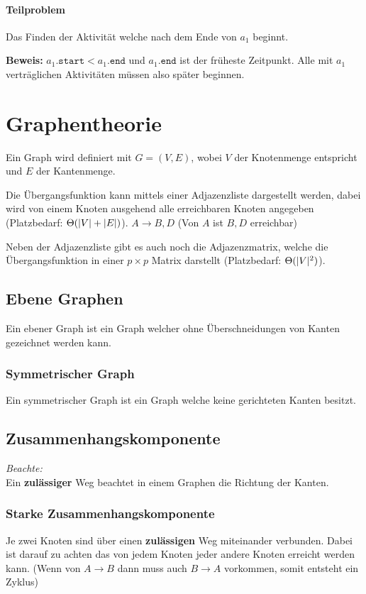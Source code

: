 \documentclass[10pt,a4paper]{article}
\begin{document}
\begin{multicols*}{4}
\paragraph{Teilproblem}
Das Finden der Aktivität welche nach dem Ende von \(a_{1}\) beginnt.

\textbf{Beweis:} \(a_{1}.\mathtt{start} < a_{1}.\mathtt{end}\) und \(a_{1}.\mathtt{end}\) ist der früheste Zeitpunkt.
Alle mit \(a_{1}\) verträglichen Aktivitäten müssen also später beginnen.

\section{Graphentheorie}

Ein Graph wird definiert mit \(G = (V,E)\), wobei \(V\) der Knotenmenge entspricht und \(E\) der Kantenmenge.

Die Übergangsfunktion kann mittels einer Adjazenzliste dargestellt werden, dabei wird von einem Knoten ausgehend alle
erreichbaren Knoten angegeben (Platzbedarf: \(\Theta(\lvert V\rvert+\lvert E\rvert)\)). \(A \rightarrow B,D\) (Von \(A\) ist \(B,D\) erreichbar)

Neben der Adjazenzliste gibt es auch noch die Adjazenzmatrix, welche die Übergangsfunktion in einer \(p \times p\)
Matrix darstellt (Platzbedarf: \(\Theta(\lvert V\rvert^2)\)).

\subsection{Ebene Graphen}

Ein ebener Graph ist ein Graph welcher ohne Überschneidungen von Kanten gezeichnet werden kann.

\subsubsection*{Symmetrischer Graph}

Ein symmetrischer Graph ist ein Graph welche keine gerichteten Kanten besitzt.

\subsection{Zusammenhangskomponente}

\textit{Beachte:}\hfill\\
Ein \textbf{zulässiger} Weg beachtet in einem Graphen die Richtung der Kanten.

\subsubsection*{Starke Zusammenhangskomponente}
Je zwei Knoten sind über einen \textbf{zulässigen} Weg miteinander verbunden. Dabei ist darauf zu achten das von jedem
Knoten jeder andere Knoten erreicht werden kann. (Wenn von \(A \rightarrow B\) dann muss auch \(B  \rightarrow A\)
vorkommen, somit entsteht ein Zyklus)


\end{multicols*}
\end{document}
